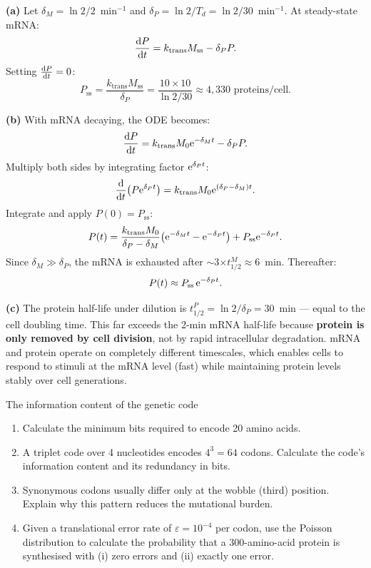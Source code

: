 \documentclass[12pt, a4paper, oneside]{report}
\begin{document}
\begin{solution}
  \textbf{(a)} Let $\delta_M = \ln2/2$~min$^{-1}$ and
  $\delta_P = \ln2/T_d = \ln2/30$~min$^{-1}$. At steady-state mRNA:
  \[
    \frac{\mathrm{d}P}{\mathrm{d}t} = k_\text{trans} M_\text{ss} - \delta_P P.
  \]
  Setting $\frac{\mathrm{d}P}{\mathrm{d}t} = 0$:
  \[
    P_\text{ss} = \frac{k_\text{trans} M_\text{ss}}{\delta_P}
                = \frac{10 \times 10}{\ln2/30}
                \approx \boxed{4{,}330 \text{ proteins/cell.}}
  \]

  \textbf{(b)} With mRNA decaying, the ODE becomes:
  \[
    \frac{\mathrm{d}P}{\mathrm{d}t} = k_\text{trans} M_0 \mathrm{e}^{-\delta_M t} - \delta_P P.
  \]
  Multiply both sides by integrating factor $\mathrm{e}^{\delta_P t}$:
  \[
    \frac{\mathrm{d}}{\mathrm{d}t}\!\left(P\mathrm{e}^{\delta_P t}\right)
    = k_\text{trans} M_0 \mathrm{e}^{(\delta_P - \delta_M)t}.
  \]
  Integrate and apply $P(0) = P_\text{ss}$:
  \[
    P(t) = \frac{k_\text{trans} M_0}{\delta_P - \delta_M}
           \!\left(\mathrm{e}^{-\delta_M t} - \mathrm{e}^{-\delta_P t}\right)
           + P_\text{ss}\mathrm{e}^{-\delta_P t}.
  \]
  Since $\delta_M \gg \delta_P$, the mRNA is exhausted after
  $\sim$3$\times t_{1/2}^M \approx 6$~min. Thereafter:
  \[
    P(t) \approx P_\text{ss}\,\mathrm{e}^{-\delta_P t}.
  \]

  \textbf{(c)} The protein half-life under dilution is
  $t_{1/2}^P = \ln2/\delta_P = 30$~min — equal to the cell
  doubling time. This far exceeds the 2-min mRNA half-life because
  \textbf{protein is only removed by cell division}, not by rapid
  intracellular degradation. mRNA and protein operate on completely
  different timescales, which enables cells to respond to stimuli
  at the mRNA level (fast) while maintaining protein levels stably
  over cell generations.
\end{solution}

\begin{problem}{\enspace{}\enspace{}\enspace The information content of the genetic code}

  \begin{enumerate}
    \item Calculate the minimum bits required to encode 20 amino acids.
    \item A triplet code over 4 nucleotides encodes $4^3 = 64$ codons.
          Calculate the code's information content and its redundancy in bits.
    \item Synonymous codons usually differ only at the wobble (third)
          position. Explain why this pattern reduces the mutational burden.
    \item Given a translational error rate of $\varepsilon = 10^{-4}$
          per codon, use the Poisson distribution to calculate the
          probability that a 300-amino-acid protein is synthesised with
          (i) zero errors and (ii) exactly one error.
  \end{enumerate}
\end{problem}
\end{document}
